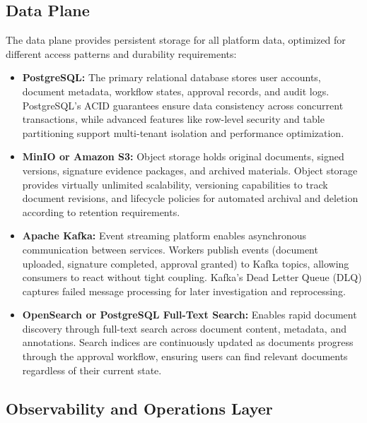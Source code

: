 \documentclass[12pt,oneside,openright,a4paper]{cpe-english-project}
\begin{document}
\vspace{1em}

\subsection{Data Plane}

The data plane provides persistent storage for all platform data, optimized for different access patterns and durability requirements:

\begin{itemize}
\item \textbf{PostgreSQL:} The primary relational database stores user accounts, document metadata, workflow states, approval records, and audit logs. PostgreSQL's ACID guarantees ensure data consistency across concurrent transactions, while advanced features like row-level security and table partitioning support multi-tenant isolation and performance optimization.

\item \textbf{MinIO or Amazon S3:} Object storage holds original documents, signed versions, signature evidence packages, and archived materials. Object storage provides virtually unlimited scalability, versioning capabilities to track document revisions, and lifecycle policies for automated archival and deletion according to retention requirements.

\item \textbf{Apache Kafka:} Event streaming platform enables asynchronous communication between services. Workers publish events (document uploaded, signature completed, approval granted) to Kafka topics, allowing consumers to react without tight coupling. Kafka's Dead Letter Queue (DLQ) captures failed message processing for later investigation and reprocessing.

\item \textbf{OpenSearch or PostgreSQL Full-Text Search:} Enables rapid document discovery through full-text search across document content, metadata, and annotations. Search indices are continuously updated as documents progress through the approval workflow, ensuring users can find relevant documents regardless of their current state.
\end{itemize}

\vspace{1em}

\subsection{Observability and Operations Layer}
\end{document}

